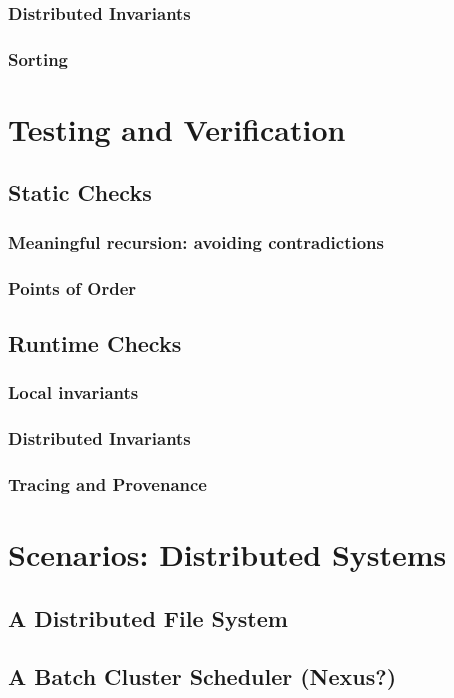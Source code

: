 \documentclass[]{book}
\begin{document}
        \subsection{Distributed Invariants}
        \subsection{Sorting}
        
\chapter{Testing and Verification}
    \section{Static Checks}
        \subsection{Meaningful recursion: avoiding contradictions}
        \subsection{Points of Order}
    \section{Runtime Checks}
        \subsection{Local invariants}
        \subsection{Distributed Invariants}
        \subsection{Tracing and Provenance}
        
\chapter{Scenarios: Distributed Systems}
    \section{A Distributed File System}
    \section{A Batch Cluster Scheduler (Nexus?)}
\end{document}
